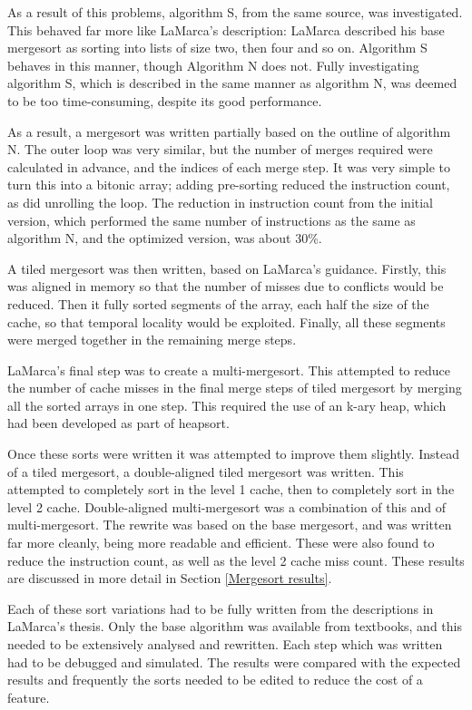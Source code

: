 As a result of this problems, algorithm S, from the same source, was
investigated. This behaved far more like LaMarca's description: LaMarca
described his base mergesort as sorting into lists of size two, then four and
so on. Algorithm S behaves in this manner, though Algorithm N does not. Fully
investigating algorithm S, which is described in the same manner as algorithm N,
was deemed to be too time-consuming, despite its good performance.

As a result, a mergesort was written partially based on the outline of algorithm
N. The outer loop was very similar, but the number of merges required were
calculated in advance, and the indices of each merge step.  It was very simple
to turn this into a bitonic array; adding pre-sorting reduced the instruction
count, as did unrolling the loop. The reduction in instruction count from the
initial version, which performed the same number of instructions as the same as
algorithm N, and the optimized version, was about 30\%.

A tiled mergesort was then written, based on LaMarca's guidance. Firstly, this
was aligned in memory so that the number of misses due to conflicts would be
reduced.  Then it fully sorted segments of the array, each half the size of the
cache, so that temporal locality would be exploited. Finally, all these segments
were merged together in the remaining merge steps.

LaMarca's final step was to create a multi-mergesort. This attempted to reduce
the number of cache misses in the final merge steps of tiled mergesort by
merging all the sorted arrays in one step. This required the use of an k-ary
heap, which had been developed as part of heapsort.

Once these sorts were written it was attempted to improve them slightly.
Instead of a tiled mergesort, a double-aligned tiled mergesort was written.
This attempted to completely sort in the level 1 cache, then to completely sort
in the level 2 cache. Double-aligned multi-mergesort was a combination of this
and of multi-mergesort. The rewrite was based on the base mergesort, and was
written far more cleanly, being more readable and efficient. These were also
found to reduce the instruction count, as well as the level 2 cache miss count.
These results are discussed in more detail in Section \ref{Mergesort results}.

Each of these sort variations had to be fully written from the descriptions in
LaMarca's thesis. Only the base algorithm was available from textbooks, and this
needed to be extensively analysed and rewritten. Each step which was written had
to be debugged and simulated. The results were compared with the expected
results and frequently the sorts needed to be edited to reduce the cost of a
feature.

